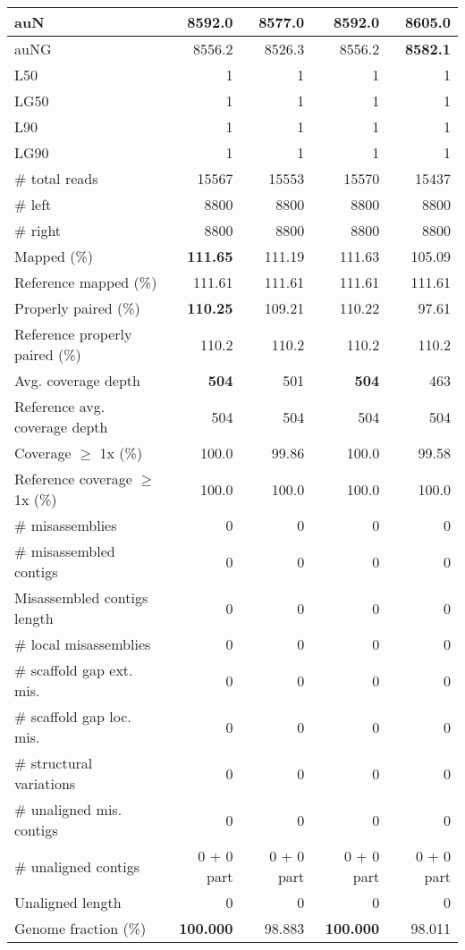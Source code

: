\documentclass[12pt,a4paper]{article}
\begin{document}
\begin{table}[ht]
\begin{center}
\begin{tabular}{|l*{4}{|r}|}
auN & 8592.0 & 8577.0 & 8592.0 & {\bf 8605.0} \\ \hline
auNG & 8556.2 & 8526.3 & 8556.2 & {\bf 8582.1} \\ \hline
L50 & 1 & 1 & 1 & 1 \\ \hline
LG50 & 1 & 1 & 1 & 1 \\ \hline
L90 & 1 & 1 & 1 & 1 \\ \hline
LG90 & 1 & 1 & 1 & 1 \\ \hline
\# total reads & 15567 & 15553 & 15570 & 15437 \\ \hline
\# left & 8800 & 8800 & 8800 & 8800 \\ \hline
\# right & 8800 & 8800 & 8800 & 8800 \\ \hline
Mapped (\%) & {\bf 111.65} & 111.19 & 111.63 & 105.09 \\ \hline
Reference mapped (\%) & 111.61 & 111.61 & 111.61 & 111.61 \\ \hline
Properly paired (\%) & {\bf 110.25} & 109.21 & 110.22 & 97.61 \\ \hline
Reference properly paired (\%) & 110.2 & 110.2 & 110.2 & 110.2 \\ \hline
Avg. coverage depth & {\bf 504} & 501 & {\bf 504} & 463 \\ \hline
Reference avg. coverage depth & 504 & 504 & 504 & 504 \\ \hline
Coverage $\geq$ 1x (\%) & 100.0 & 99.86 & 100.0 & 99.58 \\ \hline
Reference coverage $\geq$ 1x (\%) & 100.0 & 100.0 & 100.0 & 100.0 \\ \hline
\# misassemblies & 0 & 0 & 0 & 0 \\ \hline
\# misassembled contigs & 0 & 0 & 0 & 0 \\ \hline
Misassembled contigs length & 0 & 0 & 0 & 0 \\ \hline
\# local misassemblies & 0 & 0 & 0 & 0 \\ \hline
\# scaffold gap ext. mis. & 0 & 0 & 0 & 0 \\ \hline
\# scaffold gap loc. mis. & 0 & 0 & 0 & 0 \\ \hline
\# structural variations & 0 & 0 & 0 & 0 \\ \hline
\# unaligned mis. contigs & 0 & 0 & 0 & 0 \\ \hline
\# unaligned contigs & 0 + 0 part & 0 + 0 part & 0 + 0 part & 0 + 0 part \\ \hline
Unaligned length & 0 & 0 & 0 & 0 \\ \hline
Genome fraction (\%) & {\bf 100.000} & 98.883 & {\bf 100.000} & 98.011 \\ \hline

\end{tabular}
\end{center}
\end{table}
\end{document}
